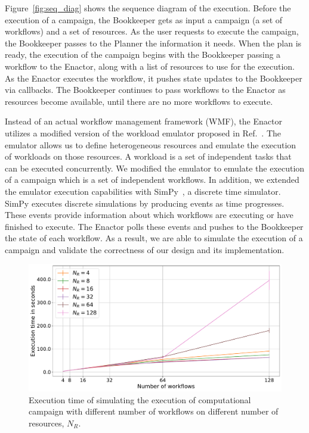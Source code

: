 Figure~\ref{fig:seq_diag} shows the sequence diagram of the execution. Before
the execution of a campaign, the Bookkeeper gets as input a campaign (a set of
workflows) and a set of resources. As the user requests to execute the campaign,
the Bookkeeper passes to the Planner the information it needs. When the plan is
ready, the execution of the campaign begins with the Bookkeeper passing a
workflow to the Enactor, along with a list of resources to use for the
execution. As the Enactor executes the workflow, it pushes state updates to the
Bookkeeper via callbacks. The Bookkeeper continues to pass workflows to the
Enactor as resources become available, until there are no more workflows to execute.

Instead of an actual workflow management framework (WMF), the Enactor utilizes a
modified version of the workload emulator proposed in
Ref.~\cite{balasubramanian2019programming}. The emulator allows us to define
heterogeneous resources and emulate the execution of workloads on those
resources. A workload is a set of independent tasks that can be executed 
concurrently. We modified the emulator to emulate the execution of a campaign 
which is a set of independent workflows.  In addition, we extended the emulator 
execution capabilities with SimPy~\cite{simpy}, a discrete time simulator. 
SimPy executes discrete simulations by producing events as time progresses. 
These events provide information about which workflows are executing or have 
finished to execute. The Enactor polls these events and pushes to the 
Bookkeeper the state of each workflow. As a result, we are able to simulate the 
execution of a campaign and validate the correctness of our design and its 
implementation.

\begin{figure}[t]
    \centering
    \includegraphics[width=.95\textwidth]{figures/manager/SimTimeWork.pdf}
    \caption{Execution time of simulating the execution of computational campaign with different number of workflows on different number of resources, $N_R$.}
    \label{fig:cm_char}
\end{figure}

